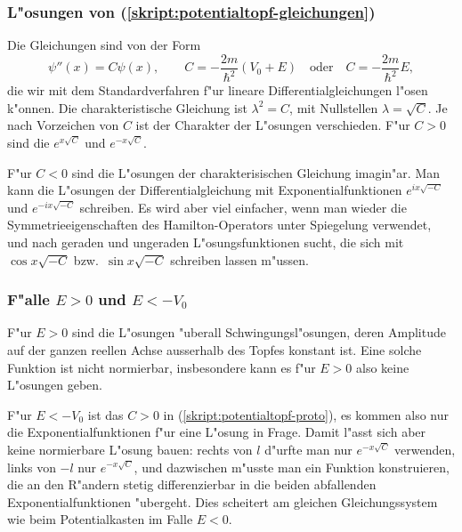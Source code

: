 \subsubsection{L"osungen von (\ref{skript:potentialtopf-gleichungen})}
Die Gleichungen sind von der Form
\begin{equation}
\psi''(x)=C\psi(x),\qquad
C=-\frac{2m}{\hbar^2}(V_0+E)
\quad
\text{oder}
\quad
C=-\frac{2m}{\hbar^2}E,
\label{skript:potentialtopf-proto}
\end{equation}
die wir mit dem Standardverfahren f"ur lineare Differentialgleichungen
l"osen k"onnen.
Die charakteristische  Gleichung ist $\lambda^2=C$, mit Nullstellen
$\lambda=\sqrt{C}$. Je nach Vorzeichen von $C$ ist der Charakter der
L"osungen verschieden.
F"ur $C>0$ sind die $e^{x\sqrt{C}}$ und $e^{-x\sqrt{C}}$.

F"ur $C<0$ sind die L"osungen der charakterisischen Gleichung imagin"ar.
Man kann die L"osungen der Differentialgleichung mit Exponentialfunktionen
$e^{ix\sqrt{-C}}$ und $e^{-ix\sqrt{-C}}$ schreiben.
Es wird aber viel einfacher, wenn man wieder die Symmetrieeigenschaften
des Hamilton-Operators unter Spiegelung
verwendet, und nach geraden und ungeraden L"osungsfunktionen sucht,
die sich mit $\cos x\sqrt{-C}$ bzw.~$\sin x\sqrt{-C}$ schreiben
lassen m"ussen.

\subsubsection{F"alle $E>0$ und $E<-V_0$}
F"ur $E>0$ sind die L"osungen "uberall Schwingungsl"osungen, deren
Amplitude auf der ganzen reellen Achse ausserhalb des Topfes
konstant ist. Eine solche Funktion ist nicht normierbar, insbesondere
kann es f"ur $E>0$ also keine L"osungen geben.

F"ur $E<-V_0$ ist das $C>0$ in (\ref{skript:potentialtopf-proto}), es kommen
also nur die Exponentialfunktionen f"ur eine L"osung in Frage.
Damit l"asst sich aber keine normierbare L"osung bauen: rechts von $l$
d"urfte man nur $e^{-x\sqrt{C}}$ verwenden, links von $-l$ nur
$e^{-x\sqrt{C}}$, und dazwischen m"usste man ein Funktion konstruieren,
die an den R"andern stetig differenzierbar in die beiden abfallenden
Exponentialfunktionen "ubergeht.
Dies scheitert am gleichen Gleichungssystem wie beim Potentialkasten
im Falle $E<0$.

